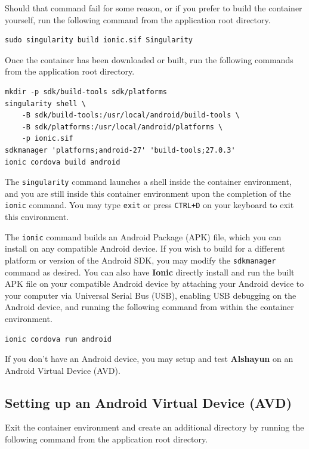 \documentclass[12pt]{report}
\begin{document}
Should that command fail for some reason, or if you prefer to build the
container yourself, run the following command from the application root
directory.

\begin{verbatim}
sudo singularity build ionic.sif Singularity
\end{verbatim}

Once the container has been downloaded or built, run the following commands from
the application root directory.

\begin{verbatim}
mkdir -p sdk/build-tools sdk/platforms
singularity shell \
    -B sdk/build-tools:/usr/local/android/build-tools \
    -B sdk/platforms:/usr/local/android/platforms \
    -p ionic.sif
sdkmanager 'platforms;android-27' 'build-tools;27.0.3'
ionic cordova build android
\end{verbatim}

The \texttt{singularity} command launches a shell inside the container
environment, and you are still inside this container environment upon the
completion of the \texttt{ionic} command. You may type \texttt{exit} or press
\texttt{CTRL+D} on your keyboard to exit this environment.

The \texttt{ionic} command builds an Android Package (APK) file, which you can
install on any compatible Android device. If you wish to build for a different
platform or version of the Android SDK, you may modify the \texttt{sdkmanager}
command as desired. You can also have \textbf{Ionic} directly install and run
the built APK file on your compatible Android device by attaching your Android
device to your computer via Universal Serial Bus (USB), enabling USB debugging
on the Android device, and running the following command from within the
container environment.

\begin{verbatim}
ionic cordova run android
\end{verbatim}

If you don't have an Android device, you may setup and test \textbf{Alshayun} on
an Android Virtual Device (AVD).

        \subsection{Setting up an Android Virtual Device (AVD)}

Exit the container environment and create an additional directory by running the
following command from the application root directory.
\end{document}
